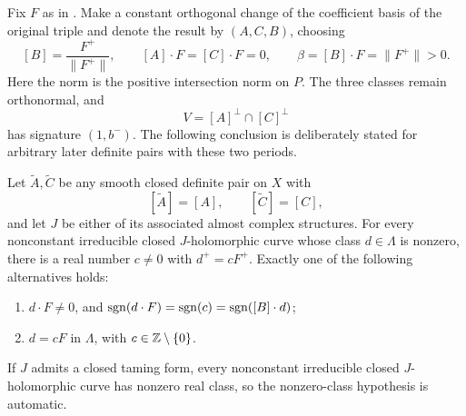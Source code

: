 Fix \(F\) as in .  Make a constant orthogonal
change of the coefficient basis of the original triple and denote the
result by \((A,C,B)\), choosing
\begin{equation}
\label{eq:lattice-adapted-periods}
  [B]=\frac{F^+}{\lVert F^+\rVert},\qquad
  [A]\cdot F=[C]\cdot F=0,\qquad
  \beta=[B]\cdot F=\lVert F^+\rVert>0.
\end{equation}
Here the norm is the positive intersection norm on \(P\).  The three
classes remain orthonormal, and
\[
  V=[A]^\perp\cap[C]^\perp
\]
has signature \((1,b^-)\).  The following conclusion is deliberately
stated for arbitrary later definite pairs with these two periods.

\begin{corollary}
\label{cor:curve-signs}
Let \(\widetilde A,\widetilde C\) be any smooth closed definite pair on
\(X\) with
\[
  [\widetilde A]=[A],\qquad [\widetilde C]=[C],
\]
and let \(J\) be either of its associated almost complex structures.
For every nonconstant irreducible closed \(J\)-holomorphic curve whose
class \(d\in\Lambda\) is nonzero, there is a real number \(c\ne0\) with
\(d^+=cF^+\).  Exactly one of the following alternatives holds:
\begin{enumerate}[label=\textup{(\roman*)}]
\item \(d\cdot F\ne0\), and
  \(\operatorname{sgn}(d\cdot F)=\operatorname{sgn}(c)=\operatorname{sgn}([B]\cdot d)\);
\item \(d=cF\) in \(\Lambda\), with \(c\in\mathbb Z\setminus\{0\}\).
\end{enumerate}
If \(J\) admits a closed taming form, every nonconstant irreducible closed
\(J\)-holomorphic curve has nonzero real class, so the nonzero-class
hypothesis is automatic.
\end{corollary}


